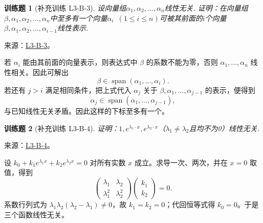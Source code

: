 \documentclass[12pt,fontset=fandol]{ctexart}
\newtheorem{exercise}{训练题}[section]
\begin{document}
\begin{exercise}[补充训练 L3-B-3]\label{prob:L3-B-3}
设向量组$\alpha_1,\alpha_2,\ldots,\alpha_n$线性无关. 证明：在向量组$\beta,\alpha_1,\alpha_2,\ldots,\alpha_n$中至多有一个向量$\alpha_i\enspace(1 \leqslant i \leqslant n)$可被其前面的$i$个向量$\beta,\alpha_1,\alpha_2,\ldots,\alpha_{i-1}$线性表示.
\end{exercise}
\noindent 来源：\href{https://github.com/yhwu-is/Linear-Algebra-Left-Undone/blob/new/%E8%AE%B2%E4%B9%89/%E4%B8%93%E9%A2%98/3%20%E6%9C%89%E9%99%90%E7%BB%B4%E7%BA%BF%E6%80%A7%E7%A9%BA%E9%97%B4.tex}{L3-B-3}。
\begin{solve}
若 $\alpha_i$ 能由其前面的向量表示，则表达式中 $\beta$ 的系数不能为零，否则 $\alpha_1,\ldots,\alpha_n$ 线性相关。因此可解出
\[\beta\in\operatorname{span}(\alpha_1,\ldots,\alpha_i).\]
若还有 $j>i$ 满足相同条件，把上式代入 $\alpha_j$ 关于 $\beta,\alpha_1,\ldots,\alpha_{j-1}$ 的表示，便得到 \[\alpha_j\in\operatorname{span}(\alpha_1,\ldots,\alpha_{j-1}),\]与已知线性无关矛盾。因此这样的下标至多有一个。
\end{solve}

\begin{exercise}[补充训练 L3-B-4]\label{prob:L3-B-4}
证明：$1,e^{\lambda_1\cdot x},e^{\lambda_2\cdot x}$（$\lambda_1\neq\lambda_2$且均不为0）线性无关.
\end{exercise}
\noindent 来源：\href{https://github.com/yhwu-is/Linear-Algebra-Left-Undone/blob/new/%E8%AE%B2%E4%B9%89/%E4%B8%93%E9%A2%98/3%20%E6%9C%89%E9%99%90%E7%BB%B4%E7%BA%BF%E6%80%A7%E7%A9%BA%E9%97%B4.tex}{L3-B-4}。
\begin{solve}
设 $k_0+k_1e^{\lambda_1x}+k_2e^{\lambda_2x}=0$ 对所有实数 $x$ 成立。求导一次、两次，并在 $x=0$ 取值，得到
\[\begin{pmatrix}\lambda_1&\lambda_2\\\lambda_1^2&\lambda_2^2\end{pmatrix}\begin{pmatrix}k_1\\k_2\end{pmatrix}=0.\]
系数行列式为 $\lambda_1\lambda_2(\lambda_2-\lambda_1)\ne0$，故 $k_1=k_2=0$；代回恒等式得 $k_0=0$。于是三个函数线性无关。
\end{solve}
\end{document}
